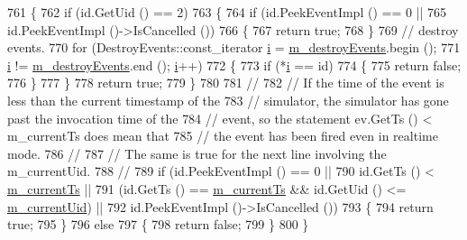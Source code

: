 \begin{DoxyCode}
761 \{
762   \textcolor{keywordflow}{if} (\textcolor{keywordtype}{id}.GetUid () == 2)
763     \{
764       \textcolor{keywordflow}{if} (\textcolor{keywordtype}{id}.PeekEventImpl () == 0 ||
765           \textcolor{keywordtype}{id}.PeekEventImpl ()->IsCancelled ())
766         \{
767           \textcolor{keywordflow}{return} \textcolor{keyword}{true};
768         \}
769       \textcolor{comment}{// destroy events.}
770       \textcolor{keywordflow}{for} (DestroyEvents::const\_iterator \hyperlink{bernuolliDistribution_8m_a6f6ccfcf58b31cb6412107d9d5281426}{i} = \hyperlink{classns3_1_1RealtimeSimulatorImpl_a18d17218962a0da6376ac2c05ba9a71a}{m\_destroyEvents}.begin (); 
771            \hyperlink{bernuolliDistribution_8m_a6f6ccfcf58b31cb6412107d9d5281426}{i} != \hyperlink{classns3_1_1RealtimeSimulatorImpl_a18d17218962a0da6376ac2c05ba9a71a}{m\_destroyEvents}.end (); \hyperlink{bernuolliDistribution_8m_a6f6ccfcf58b31cb6412107d9d5281426}{i}++)
772         \{
773           \textcolor{keywordflow}{if} (*\hyperlink{bernuolliDistribution_8m_a6f6ccfcf58b31cb6412107d9d5281426}{i} == \textcolor{keywordtype}{id})
774             \{
775               \textcolor{keywordflow}{return} \textcolor{keyword}{false};
776             \}
777         \}
778       \textcolor{keywordflow}{return} \textcolor{keyword}{true};
779     \}
780 
781   \textcolor{comment}{//}
782   \textcolor{comment}{// If the time of the event is less than the current timestamp of the }
783   \textcolor{comment}{// simulator, the simulator has gone past the invocation time of the }
784   \textcolor{comment}{// event, so the statement ev.GetTs () < m\_currentTs does mean that }
785   \textcolor{comment}{// the event has been fired even in realtime mode.}
786   \textcolor{comment}{//}
787   \textcolor{comment}{// The same is true for the next line involving the m\_currentUid.}
788   \textcolor{comment}{//}
789   \textcolor{keywordflow}{if} (\textcolor{keywordtype}{id}.PeekEventImpl () == 0 ||
790       \textcolor{keywordtype}{id}.GetTs () < \hyperlink{classns3_1_1RealtimeSimulatorImpl_a613ff41dee1e66129c4d5cc81c00cf60}{m\_currentTs} ||
791       (\textcolor{keywordtype}{id}.GetTs () == \hyperlink{classns3_1_1RealtimeSimulatorImpl_a613ff41dee1e66129c4d5cc81c00cf60}{m\_currentTs} && \textcolor{keywordtype}{id}.GetUid () <= \hyperlink{classns3_1_1RealtimeSimulatorImpl_a74f7fe3f1ca8b69baac6261b11f1c2a6}{m\_currentUid}) ||
792       \textcolor{keywordtype}{id}.PeekEventImpl ()->IsCancelled ()) 
793     \{
794       \textcolor{keywordflow}{return} \textcolor{keyword}{true};
795     \}
796   \textcolor{keywordflow}{else}
797     \{
798       \textcolor{keywordflow}{return} \textcolor{keyword}{false};
799     \}
800 \}
\end{DoxyCode}


